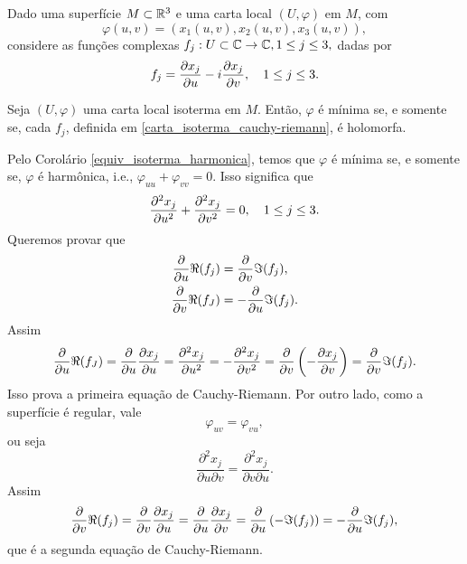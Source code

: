 Dado uma superfície $M \subset \mathbb{R}^3$ e uma carta local $(U, \varphi)$ em $M$, com
\begin{equation*}
\varphi(u,v) = (x_1(u,v), x_2(u,v), x_3(u,v)),
\end{equation*}
considere as funções complexas $f_j: U \subset \mathbb{C} \rightarrow \mathbb{C}, 1 \leq j \leq 3,$ dadas por
\begin{equation}\label{carta_isoterma_cauchy-riemann}
f_j = \frac{\partial x_j}{\partial u} - i \frac{\partial x_j}{\partial v}, \quad 1 \leq j \leq 3.
\end{equation}

\begin{lema}
	Seja $(U, \varphi)$ uma carta local isoterma em $M$. Então, $\varphi$ é mínima se, e somente se, cada $f_j$, definida em \eqref{carta_isoterma_cauchy-riemann}, é holomorfa.
\end{lema}

\begin{demonstracao}
	Pelo Corolário \ref{equiv_isoterma_harmonica}, temos que $\varphi$ é mínima se, e somente se, $\varphi$ é harmônica, i.e., $\varphi_{uu} + \varphi_{vv} = 0$. Isso significa que
	\begin{equation*}
	\frac{\partial^2 x_j}{\partial u^2} + \frac{\partial^2 x_j}{\partial v^2} = 0, \quad 1 \leq j \leq 3.
	\end{equation*}
	Queremos provar que
	\begin{align*}
	\frac{\partial}{\partial u} \Re(f_j) &= \frac{\partial}{\partial v} \Im(f_j),\\
	\frac{\partial}{\partial v} \Re(f_J) &= - \frac{\partial}{\partial u} \Im(f_j).
	\end{align*}
	Assim
	\begin{equation*}
	\frac{\partial}{\partial u} \Re(f_J) = \frac{\partial}{\partial u} \frac{\partial x_j}{\partial u} = \frac{\partial^2 x_j}{\partial u^2} = - \frac{\partial^2 x_j}{\partial v^2} = \frac{\partial}{\partial v} \left( - \frac{\partial x_j}{\partial v} \right) = \frac{\partial}{\partial v} \Im(f_j).
	\end{equation*}
	Isso prova a primeira equação de Cauchy-Riemann. Por outro lado, como a superfície é regular, vale
	\begin{equation*}
	\varphi_{uv} = \varphi_{vu},
	\end{equation*}
	ou seja
	\begin{equation*}
	\frac{\partial^2 x_j}{\partial u \partial v} = \frac{\partial^2 x_j}{\partial v \partial u}.
	\end{equation*}
	Assim
	\begin{equation*}
	\frac{\partial}{\partial v} \Re(f_j) = \frac{\partial}{\partial v} \frac{\partial x_j}{\partial u} = \frac{\partial}{\partial u} \frac{\partial x_j}{\partial v}
	= \frac{\partial}{\partial u} \left( - \Im(f_j) \right)
	= - \frac{\partial}{\partial u} \Im(f_j),
	\end{equation*}
	que é a segunda equação de Cauchy-Riemann.
\end{demonstracao}

